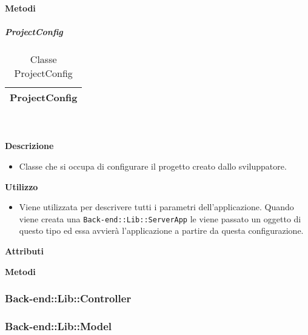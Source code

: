 		\textbf{Metodi} 
	\begin{itemize}
		\end{itemize}
			\subparagraph{ProjectConfig} 
\begin{table}[ht]
\begin{center}
\bgroup
	\setlength{\arrayrulewidth}{0.6mm}
	\def\arraystretch{1}
		\begin{tabular}{ | p{12cm} | }
				\hline  
					\centerline{\textbf{ProjectConfig}}
		\\ \hline 
				\hline
				\hline
		
		\end{tabular}
\egroup
\caption{Classe ProjectConfig}
\end{center}
\end{table}  \textbf{\\ \\ Descrizione} 
					\begin{itemize}
						\item[] Classe che si occupa di configurare il progetto creato dallo sviluppatore.
					\end{itemize}      
				\textbf{Utilizzo}  
					\begin{itemize}
						\item[] Viene utilizzata per descrivere tutti i parametri dell'applicazione. Quando viene creata una \texttt{Back-end::Lib::ServerApp} le viene passato un oggetto di questo tipo ed essa avvierà l'applicazione a partire da questa configurazione.
					\end{itemize}
			 \textbf{Attributi} 
	\begin{itemize}
		\end{itemize}
		
		\textbf{Metodi} 
	\begin{itemize}
		\end{itemize}
	\subsubsection{Back-end::Lib::Controller} 
	\subsubsection{Back-end::Lib::Model} 
